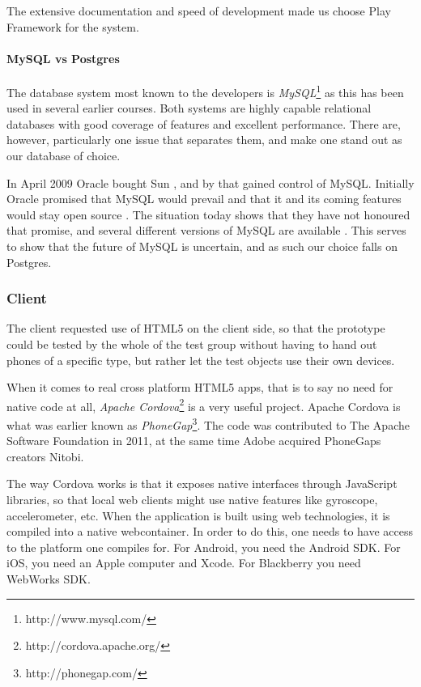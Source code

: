 \documentclass[11pt]{book}
\begin{document}
The extensive documentation and speed of development made us choose Play Framework for the system.

\paragraph{MySQL vs Postgres}
The database system most known to the developers is \emph{MySQL}\footnote{http://www.mysql.com/} as this has been used in several earlier courses. Both systems are highly capable relational databases with good coverage of features and excellent performance. There are, however, particularly one issue that separates them, and make one stand out as our database of choice.

In April 2009 Oracle bought Sun \cite{sun}, and by that gained control of MySQL. Initially Oracle promised that MySQL would prevail and that it and its coming features would stay open source \cite{mysql}. The situation today shows that they have not honoured that promise, and several different versions of MySQL are available \cite{mysqlproducts}. This serves to show that the future of MySQL is uncertain, and as such our choice falls on Postgres.

\subsubsection{Client}
The client requested use of HTML5 on the client side, so that the prototype could be tested by the whole of the test group without having to hand out phones of a specific type, but rather let the test objects use their own devices.

When it comes to real cross platform HTML5 apps, that is to say no need for native code at all, \emph{Apache Cordova}\footnote{http://cordova.apache.org/} is a very useful project. Apache Cordova is what was earlier known as \emph{PhoneGap}\footnote{http://phonegap.com/}.\cite{phonegap} The code was contributed to The Apache Software Foundation in 2011, at the same time Adobe acquired PhoneGaps creators Nitobi.

The way Cordova works is that it exposes native interfaces through JavaScript libraries, so that local web clients might use native features like gyroscope, accelerometer, etc. When the application is built using web technologies, it is compiled into a native webcontainer. In order to do this, one needs to have access to the platform one compiles for. For Android, you need the Android SDK. For iOS, you need an Apple computer and Xcode. For Blackberry you need WebWorks SDK.
\end{document}
